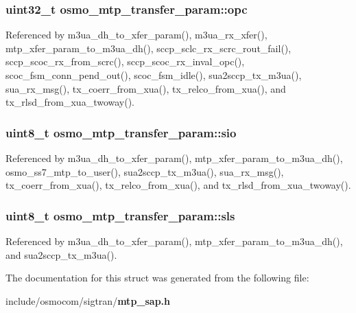 \subsubsection[{opc}]{\setlength{\rightskip}{0pt plus 5cm}uint32\+\_\+t osmo\+\_\+mtp\+\_\+transfer\+\_\+param\+::opc}\label{structosmo__mtp__transfer__param_a79496201ac3dd69528dc41cafc82eaa3}


Referenced by m3ua\+\_\+dh\+\_\+to\+\_\+xfer\+\_\+param(), m3ua\+\_\+rx\+\_\+xfer(), mtp\+\_\+xfer\+\_\+param\+\_\+to\+\_\+m3ua\+\_\+dh(), sccp\+\_\+sclc\+\_\+rx\+\_\+scrc\+\_\+rout\+\_\+fail(), sccp\+\_\+scoc\+\_\+rx\+\_\+from\+\_\+scrc(), sccp\+\_\+scoc\+\_\+rx\+\_\+inval\+\_\+opc(), scoc\+\_\+fsm\+\_\+conn\+\_\+pend\+\_\+out(), scoc\+\_\+fsm\+\_\+idle(), sua2sccp\+\_\+tx\+\_\+m3ua(), sua\+\_\+rx\+\_\+msg(), tx\+\_\+coerr\+\_\+from\+\_\+xua(), tx\+\_\+relco\+\_\+from\+\_\+xua(), and tx\+\_\+rlsd\+\_\+from\+\_\+xua\+\_\+twoway().

\subsubsection[{sio}]{\setlength{\rightskip}{0pt plus 5cm}uint8\+\_\+t osmo\+\_\+mtp\+\_\+transfer\+\_\+param\+::sio}\label{structosmo__mtp__transfer__param_aa99084a9d797fbd281f25840be2dad35}


Referenced by m3ua\+\_\+dh\+\_\+to\+\_\+xfer\+\_\+param(), mtp\+\_\+xfer\+\_\+param\+\_\+to\+\_\+m3ua\+\_\+dh(), osmo\+\_\+ss7\+\_\+mtp\+\_\+to\+\_\+user(), sua2sccp\+\_\+tx\+\_\+m3ua(), sua\+\_\+rx\+\_\+msg(), tx\+\_\+coerr\+\_\+from\+\_\+xua(), tx\+\_\+relco\+\_\+from\+\_\+xua(), and tx\+\_\+rlsd\+\_\+from\+\_\+xua\+\_\+twoway().

\subsubsection[{sls}]{\setlength{\rightskip}{0pt plus 5cm}uint8\+\_\+t osmo\+\_\+mtp\+\_\+transfer\+\_\+param\+::sls}\label{structosmo__mtp__transfer__param_a8150b3aa1e200a76663636660f570569}


Referenced by m3ua\+\_\+dh\+\_\+to\+\_\+xfer\+\_\+param(), mtp\+\_\+xfer\+\_\+param\+\_\+to\+\_\+m3ua\+\_\+dh(), and sua2sccp\+\_\+tx\+\_\+m3ua().



The documentation for this struct was generated from the following file\+:\begin{DoxyCompactItemize}
\item 
include/osmocom/sigtran/{\bf mtp\+\_\+sap.\+h}\end{DoxyCompactItemize}
